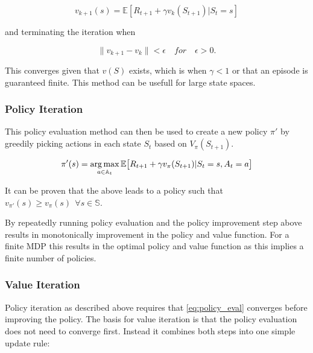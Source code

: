 \begin{equation}
    v_{k+1}(s) = \mathbb{E}[R_{t+1} + \gamma v_k(S_{t+1})| S_t=s]
    \label{eq:policy_eval}
\end{equation}

and terminating the iteration when 

\begin{equation}
    \| v_{k+1} - v_k \| < \epsilon \quad for \quad \epsilon > 0.
    \label{eq:policy_eval_termination_condition}
\end{equation}

This converges given that $v(S)$ exists, which is when $\gamma < 1$  or that an episode is guaranteed finite. This method can be usefull for large state spaces.


\subsubsection{Policy Iteration}

This policy evaluation method can then be used to create a new policy $\pi'$ by greedily picking actions in each state $S_t$ based on $V_\pi(S_{t+1})$. 

\begin{equation}
    \pi'(s) = \operatorname*{arg\,max}_{a\in \mathbb{A}_t} \mathbb{E}\big[R_{t+1} + \gamma v_\pi(S_{t+1})|S_t=s, A_t=a\big]
    \label{eq:policy_iter}
\end{equation}

It can be proven that the above leads to a policy such that $v_{\pi'}(s) \geq v_\pi(s) ~~ \forall s \in \mathbb{S}$. \citep[p.~78-79]{sutton_barto_2018}

By repeatedly running policy evaluation and the policy improvement step above results in monotonically improvement in the policy and value function. For a finite MDP this results in the optimal policy and value function as this implies a finite number of policies.


\subsubsection{Value Iteration}

Policy iteration as described above requires that \ref{eq:policy_eval} converges before improving the policy. The basis for value iteration is that the policy evaluation does not need to converge first. Instead it combines both steps into one simple update rule:

